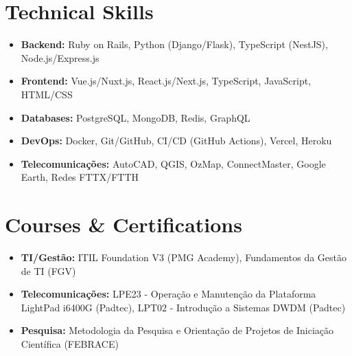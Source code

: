 \documentclass[letterpaper,11pt]{article}
\newcommand{\resumeItem}[1]{
  \item\small{
    {#1 \vspace{-2pt}}
  }
}
\newcommand{\resumeSubHeadingListStart}{\begin{itemize}[leftmargin=0.0in, label={}]}
\newcommand{\resumeSubHeadingListEnd}{\end{itemize}}
\begin{document}
\section{Technical Skills}
\begin{minipage}{\dimexpr\textwidth-0.2cm}
  \hspace*{0.2cm}
  \begin{minipage}{\dimexpr\textwidth}
    \resumeSubHeadingListStart
      \setlength{\itemsep}{2pt} %
      \resumeItem{\textbf{Backend:} Ruby on Rails, Python (Django/Flask), TypeScript (NestJS), Node.js/Express.js}
      \resumeItem{\textbf{Frontend:} Vue.js/Nuxt.js, React.js/Next.js, TypeScript, JavaScript, HTML/CSS}
      \resumeItem{\textbf{Databases:} PostgreSQL, MongoDB, Redis, GraphQL}
      \resumeItem{\textbf{DevOps:} Docker, Git/GitHub, CI/CD (GitHub Actions), Vercel, Heroku}
      \resumeItem{\textbf{Telecomunicações:} AutoCAD, QGIS, OzMap, ConnectMaster, Google Earth, Redes FTTX/FTTH}

    \resumeSubHeadingListEnd
  \end{minipage}
\end{minipage}
\vspace{10pt}


\section{Courses \& Certifications}
\begin{minipage}{\dimexpr\textwidth-0.2cm}
  \hspace*{0.2cm}
  \begin{minipage}{\dimexpr\textwidth}
    \resumeSubHeadingListStart
      \setlength{\itemsep}{2pt}
      \resumeItem{
        \textbf{TI/Gestão:} ITIL Foundation V3 (PMG Academy), Fundamentos da Gestão de TI (FGV)
      }
      \resumeItem{
        \textbf{Telecomunicações:} LPE23 - Operação e Manutenção da Plataforma LightPad i6400G (Padtec), LPT02 - Introdução a Sistemas DWDM (Padtec)
      }
      \resumeItem{
        \textbf{Pesquisa:} Metodologia da Pesquisa e Orientação de Projetos de Iniciação Científica (FEBRACE)
      }
    \resumeSubHeadingListEnd
  \end{minipage}
\end{minipage}
\vspace{10pt}
\end{document}
